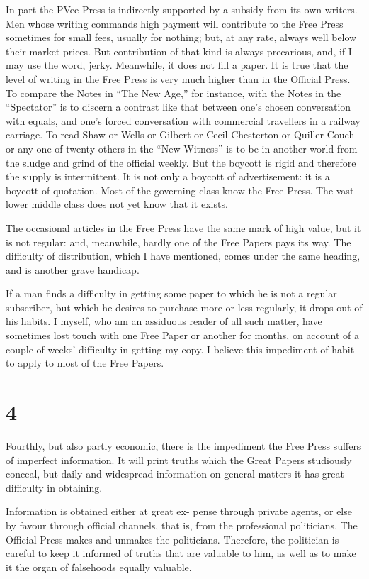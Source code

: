 \documentclass{book}
\begin{document}
In part the PVee Press is indirectly supported by a subsidy from its own writers. Men whose writing commands high payment will contribute to the Free Press sometimes for small fees, usually for nothing; but, at any rate, always well below their market prices. But contribution of that kind is always precarious, and, if I may use the word, jerky. Meanwhile, it does not fill a paper. It is true that the level of writing in the Free Press is very much higher than in the Official Press. To compare the Notes in “The New Age,” for instance, with the Notes in the “Spectator” is to discern a contrast like that between one’s chosen conversation with equals, and one’s forced conversation with commercial travellers in a railway carriage. To read Shaw or Wells or Gilbert or Cecil Chesterton or Quiller Couch or any one of twenty others in the “New Witness” is to be in another world from the sludge and grind of the official weekly. But the boycott is rigid and therefore the supply is intermittent. It is not only a boycott of advertisement: it is a boycott of quotation. Most of the governing class know the Free Press. The vast lower middle class does not yet know that it exists.

The occasional articles in the Free Press have the same mark of high value, but it is not regular: and, meanwhile, hardly one of the Free Papers pays its way. The difficulty of distribution, which I have mentioned, comes under the same heading, and is another grave handicap.

If a man finds a difficulty in getting some paper to which he is not a regular subscriber, but which he desires to purchase more or less regularly, it drops out of his habits. I myself, who am an assiduous reader of all such matter, have sometimes lost touch with one Free Paper or another for months, on account of a couple of weeks’ difficulty in getting my copy. I believe this impediment of habit to apply to most of the Free Papers.

\section*{4}
Fourthly, but also partly economic, there is the impediment the Free Press suffers of imperfect information. It will print truths which the Great Papers studiously conceal, but daily and widespread information on general matters it has great difficulty in obtaining.

Information is obtained either at great ex- pense through private agents, or else by favour through official channels, that is, from the professional politicians. The Official Press makes and unmakes the politicians. Therefore, the politician is careful to keep it informed of truths that are valuable to him, as well as to make it the organ of falsehoods equally valuable.
\end{document}
